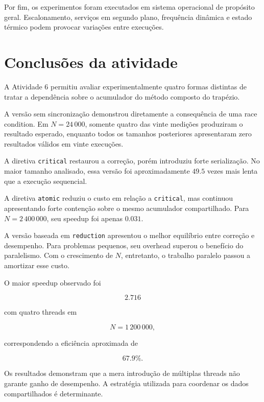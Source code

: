 Por fim, os experimentos foram executados em sistema operacional de
propósito geral. Escalonamento, serviços em segundo plano, frequência
dinâmica e estado térmico podem provocar variações entre execuções.


\section{Conclusões da atividade}

\label{sec:atvd06-conclusao}

A Atividade 6 permitiu avaliar experimentalmente quatro formas distintas de
tratar a dependência sobre o acumulador do método composto do trapézio.

A versão sem sincronização demonstrou diretamente a consequência de uma race
condition. Em \(N=24\,000\), somente quatro das vinte medições produziram o
resultado esperado, enquanto todos os tamanhos posteriores apresentaram
zero resultados válidos em vinte execuções.

A diretiva \texttt{critical} restaurou a correção, porém introduziu forte
serialização. No maior tamanho analisado, essa versão foi aproximadamente
\(49.5\) vezes mais lenta que a execução sequencial.

A diretiva \texttt{atomic} reduziu o custo em relação a
\texttt{critical}, mas continuou apresentando forte contenção sobre o mesmo
acumulador compartilhado. Para \(N=2\,400\,000\), seu speedup foi apenas
\(0.031\).

A versão baseada em \texttt{reduction} apresentou o melhor equilíbrio entre
correção e desempenho. Para problemas pequenos, seu overhead superou o
benefício do paralelismo. Com o crescimento de \(N\), entretanto, o trabalho
paralelo passou a amortizar esse custo.

O maior speedup observado foi

\begin{equation}
    \boxed{2.716}
\end{equation}

com quatro threads em

\begin{equation}
    N=1\,200\,000,
\end{equation}

correspondendo a eficiência aproximada de

\begin{equation}
    \boxed{67.9\%}.
\end{equation}

Os resultados demonstram que a mera introdução de múltiplas threads não
garante ganho de desempenho. A estratégia utilizada para coordenar os dados
compartilhados é determinante.

